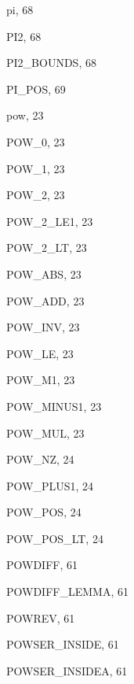 \begin{theindex}
  \item {\ptt pi}, 68
  \item {\ptt PI2}, 68
  \item {\ptt PI2\_BOUNDS}, 68
  \item {\ptt PI\_POS}, 69
  \item {\ptt pow}, 23
  \item {\ptt POW\_0}, 23
  \item {\ptt POW\_1}, 23
  \item {\ptt POW\_2}, 23
  \item {\ptt POW\_2\_LE1}, 23
  \item {\ptt POW\_2\_LT}, 23
  \item {\ptt POW\_ABS}, 23
  \item {\ptt POW\_ADD}, 23
  \item {\ptt POW\_INV}, 23
  \item {\ptt POW\_LE}, 23
  \item {\ptt POW\_M1}, 23
  \item {\ptt POW\_MINUS1}, 23
  \item {\ptt POW\_MUL}, 23
  \item {\ptt POW\_NZ}, 24
  \item {\ptt POW\_PLUS1}, 24
  \item {\ptt POW\_POS}, 24
  \item {\ptt POW\_POS\_LT}, 24
  \item {\ptt POWDIFF}, 61
  \item {\ptt POWDIFF\_LEMMA}, 61
  \item {\ptt POWREV}, 61
  \item {\ptt POWSER\_INSIDE}, 61
  \item {\ptt POWSER\_INSIDEA}, 61

  \indexspace


\end{theindex}
